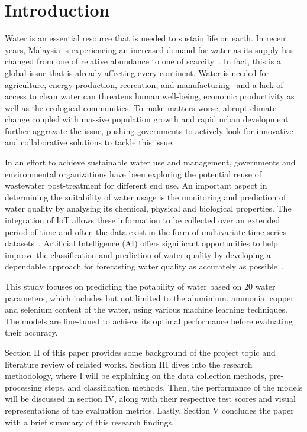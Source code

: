 \documentclass[conference]{IEEEtran}
\begin{document}
\section{Introduction}
Water is an essential resource that is needed to sustain life on earth. In recent years, Malaysia is experiencing an increased demand for water as its supply has changed from one of relative abundance to one of scarcity~\cite{ahmed_siwar_2014}. In fact, this is a global issue that is already affecting every continent. Water is needed for agriculture, energy production, recreation, and manufacturing~\cite{anang2019factors} and a lack of access to clean water can threatens human well-being, economic productivity as well as the ecological communities. To make matters worse, abrupt climate change coupled with massive population growth and rapid urban development further aggravate the issue, pushing governments to actively look for innovative and collaborative solutions to tackle this issue.

In an effort to achieve sustainable water use and management, governments and environmental organizations have been exploring the potential reuse of wastewater post-treatment for different end use. An important aspect in determining the suitability of water usage is the monitoring and prediction of water quality by analysing its chemical, physical and biological properties. The integration of IoT allows these information to be collected over an extended period of time and often the data exist in the form of multivariate time-series datasets~\cite{zhou2018water}. Artificial Intelligence (AI) offers significant opportunities to help improve the classification and prediction of water quality by developing a dependable approach for forecasting water quality as accurately as possible~\cite{nasir2022water}. 

This study focuses on predicting the potability of water based on 20 water parameters, which includes but not limited to the aluminium, ammonia, copper and selenium content of the water, using various machine learning techniques. The models are fine-tuned to achieve its optimal performance before evaluating their accuracy. 

Section II of this paper provides some background of the project topic and literature review of related works. Section III dives into the research methodology, where I will be explaining on the data collection methods, pre-processing steps, and classification methods. Then, the performance of the models will be discussed in section IV, along with their respective test scores and visual representations of the evaluation metrics. Lastly, Section V concludes the paper with a brief summary of this research findings.
     
\end{document}
